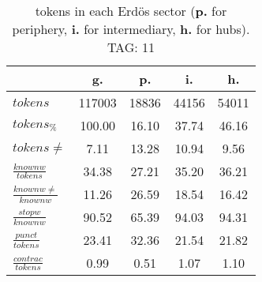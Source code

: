 \begin{table}[h!]
\begin{center}
\begin{tabular}{| l | c | c | c | c |}\hline
 & g. & p. & i. & h. \\\hline
$tokens$ & 117003  & 18836  & 44156  & 54011 \\\hline
$tokens_{\%}$ & 100.00  & 16.10  & 37.74  & 46.16 \\\hline
$tokens \neq$ & 7.11  & 13.28  & 10.94  & 9.56 \\\hline
$\frac{knownw}{tokens}$ & 34.38  & 27.21  & 35.20  & 36.21 \\\hline
$\frac{knownw \neq}{knownw}$ & 11.26  & 26.59  & 18.54  & 16.42 \\\hline
$\frac{stopw}{knownw}$ & 90.52  & 65.39  & 94.03  & 94.31 \\\hline
$\frac{punct}{tokens}$ & 23.41  & 32.36  & 21.54  & 21.82 \\\hline
$\frac{contrac}{tokens}$ & 0.99  & 0.51  & 1.07  & 1.10 \\\hline
\end{tabular}
\caption{tokens in each Erd\"os sector ({{\bf p.}} for periphery, {{\bf i.}} for intermediary, 
    {{\bf h.}} for hubs). TAG: 11}
\end{center}
\end{table}